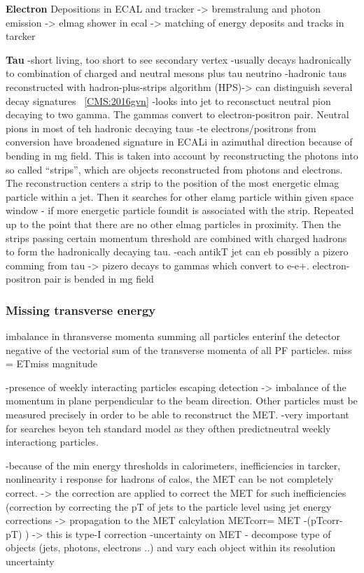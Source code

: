 \textbf{Electron}
Depositions in ECAL and tracker -> bremstralung and photon emission -> elmag shower in ecal
-> matching of energy deposits and tracks in tarcker~\cite{Khachatryan:2015iwa}


\textbf{Tau}
-short living, too short to see secondary vertex
-usually decays hadronically to combination of charged and neutral mesons plus tau neutrino
-hadronic taus reconstructed with hadron-plus-strips algorithm (HPS)-> can distinguish several decay signatures ~\ref{CMS:2016gvn}
	-looks into jet to reconsctuct neutral pion decaying to two gamma. The gammas convert to electron-positron pair. Neutral pions in most of teh hadronic decaying taus
         -te electrons/positrons from conversion have broadened signature in ECALi in azimuthal direction because of bending in mg field. This is taken into account by reconstructing the photons into so called ``strips'', which are objects reconstructed from photons and electrons. The reconstruction centers a strip to the position of the most energetic elmag particle within a jet. Then it searches for other elamg particle within given space window - if more energetic particle foundit is associated with the strip. Repeated up to the point that there are no other elmag particles in proximity. Then the strips passing certain momentum threshold are combined with charged hadrons to form the hadronically decaying tau.
	-each antikT jet can eb possibly a pizero comming from tau -> pizero decays to gammas which convert to e-e+. electron-positron pair is bended in mg field

\subsubsection{Missing transverse energy}


imbalance in thransverse momenta summing all particles enterinf the detector
negative of the vectorial sum of the transverse momenta of all PF particles.
 miss =
ETmiss magnitude
~\cite{CMS:2016ljj}

-presence of weekly interacting particles escaping detection -> imbalance of the momentum in plane perpendicular to the beam direction. Other particles must be measured precisely in order to be able to reconstruct the MET.
-very important for searches beyon teh standard model as they ofthen predictneutral weekly interactiong particles.

-because of the min energy thresholds in calorimeters, inefficiencies in tarcker, nonlinearity i  response for hadrons of calos, the MET can be not completely correct. -> the correction are applied to correct the MET for such inefficiencies (correction by correcting the pT of jets to the particle level using jet energy corrections -> propagation to the MET calcylation METcorr= MET -(pTcorr-pT) )
-> this is type-I correction %
-uncertainty on MET - decompose type of objects (jets, photons, electrons ..) and vary each object within its resolution uncertainty  

